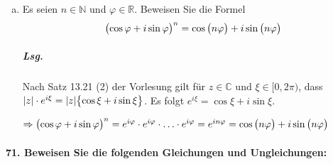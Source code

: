 \documentclass{scrreprt}
\begin{document}
\begin{enumerate}[(a)]
\item Es seien $n \in \mathbb{N}$ und $\varphi \in \mathbb{R}$.
  Beweisen Sie die Formel
  \[
    \qty\big(\cos \varphi + i \sin \varphi)^n = \cos\qty\big(n\varphi) + i \sin\qty\big(n\varphi)
  \]

  \subparagraph{Lsg.} Nach Satz 13.21 (2) der Vorlesung gilt für
  $z \in \mathbb{C}$ und $\xi \in \big[0, 2\pi \big)$, dass
  $\abs{z} \cdot e^{i\xi} = \abs{z}\qty\big{\cos\xi + i\sin\xi}$.
  Es folgt $e^{i\xi} = \cos\xi + i\sin\xi$.

  $\Rightarrow \qty\big(\cos \varphi + i \sin \varphi)^n =
  e^{i\varphi} \cdot e^{i\varphi} \cdot \ldots \cdot e^{i\varphi}
  = e^{in\varphi} = \cos\qty\big(n\varphi) + i\sin\qty\big(n\varphi)$
\end{enumerate}

\newpage
\paragraph{71. Beweisen Sie die folgenden Gleichungen und Ungleichungen:}
\end{document}
